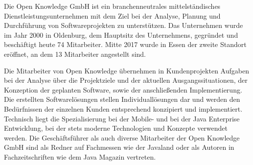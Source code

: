 Die Open Knowledge GmbH ist ein branchenneutrales mittelständisches Dienstleistungsunternehmen mit dem Ziel bei der Analyse, Planung und Durchführung von Softwareprojekten zu unterstützen. Das Unternehmen wurde im Jahr 2000 in Oldenburg, dem Hauptsitz des Unternehmens, gegründet und beschäftigt heute 74 Mitarbeiter. Mitte 2017 wurde in Essen der zweite Standort eröffnet, an dem 13 Mitarbeiter angestellt sind.

Die Mitarbeiter von Open Knowledge übernehmen in Kundenprojekten Aufgaben bei der Analyse über die Projektziele und der aktuellen Ausgangssituationen, der Konzeption der geplanten Software, sowie der anschließenden Implementierung. Die erstellten Softwarelösungen stellen Individuallösungen dar und werden den Bedürfnissen der einzelnen Kunden entsprechend konzipiert und implementiert. Technisch liegt die Spezialisierung bei der Mobile- und bei der Java Enterprise Entwicklung, bei der stets moderne Technologien und Konzepte verwendet werden. Die Geschäftsführer als auch diverse Mitarbeiter der Open Knowledge GmbH sind als Redner auf Fachmessen wie der Javaland oder als Autoren in Fachzeitschriften wie dem Java Magazin vertreten. %

%

\pagebreak
